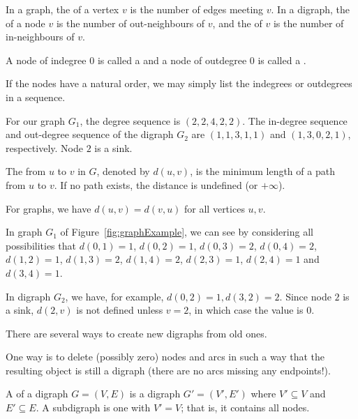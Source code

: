 \begin{Definition} 
In a graph, the  of a vertex $v$ is the number of edges
meeting $v$. In a digraph, the  of a node $v$ is the
number of out-neighbours of $v$, and the  of $v$ is the
number of in-neighbours of $v$.

A node of indegree $0$ is called a  and a node of outdegree $0$ is called a .
\end{Definition}

If the nodes have a natural order, we may simply list the indegrees or
outdegrees in a sequence.

\begin{Example}
For our graph $G_1$, the degree sequence is $(2, 2, 4, 2, 2)$.
The in-degree sequence and out-degree sequence of the digraph $G_2$ are
$(1,1,3,1,1)$ and $(1,3,0,2,1)$, respectively. Node $2$ is a sink.
\end{Example}


\begin{Definition}
The  from $u$ to $v$ in $G$, denoted by $d(u,v)$, is 
the minimum length of a path from $u$ to $v$. If no path exists, the 
distance is undefined (or $+\infty$).
\end{Definition}

For graphs, we have $d(u,v) = d(v,u)$ for all vertices $u, v$. 

\begin{Example}
In graph $G_1$ of Figure~\ref{fig:graphExample}, we can see by considering
all possibilities that $d(0, 1) = 1$, $d(0, 2) = 1$, $d(0, 3) = 2$,
$d(0, 4) = 2$, $d(1, 2) = 1$, $d(1, 3) = 2$, $d(1, 4) = 2$, $d(2, 3) =
1$, $d(2, 4) = 1$ and $d(3, 4) = 1$.

In digraph $G_2$, we have, for example, $d(0, 2) = 1, 
d(3, 2) = 2$. Since node $2$ is a sink, $d(2, v)$ is not defined 
unless $v = 2$, in which case the value is $0$.

\end{Example}



There are several ways to create new digraphs from old ones.

One way is to delete (possibly zero) nodes and arcs in such a way that the 
resulting object is still a digraph (there are no arcs missing any
endpoints!).

\begin{Definition}
A  of a digraph $G = (V, E)$ is a digraph $G' = (V', E')$ 
where $V'\subseteq V$ and $E'\subseteq E$. A  subdigraph 
is one with $V'=V$; that is, it contains all nodes.
\end{Definition}

